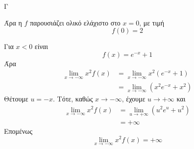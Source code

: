 \begin{thema}{Γ}
\begin{erwthma}
Άρα η $f$ παρουσιάζει ολικό ελάχιστο στο $x=0$, με τιμή
\[f(0)=2\]

\item Για $x<0$ είναι
\[f(x)=e^{-x}+1\]
Άρα
\begin{align*}
\lim\limits_{x\to-\infty}x^2f(x)
&=\lim\limits_{x\to-\infty}x^2(e^{-x}+1)\\
&=\lim\limits_{x\to-\infty}\left(x^2e^{-x}+x^2\right)
\end{align*}
Θέτουμε $u=-x$. Τότε, καθώς $x\to-\infty$, έχουμε $u\to+\infty$ και
\begin{align*}
\lim\limits_{x\to-\infty}x^2f(x)
&=\lim\limits_{u\to+\infty}\left(u^2e^u+u^2\right)\\
&=+\infty
\end{align*}
Επομένως
\[\lim\limits_{x\to-\infty}x^2f(x)=+\infty\]
\end{erwthma}
\end{thema}

